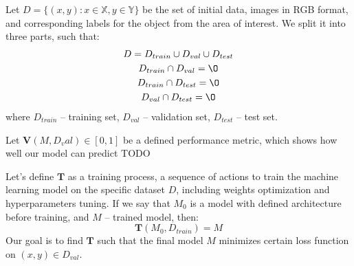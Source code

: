 \documentclass[14pt,a4paper]{extarticle}
\newcounter{e}
\numberwithin{equation}{section}
\numberwithin{figure}{section}
\begin{document}
Let $D = \{(x, y): x \in \mathbb{X}, y \in \mathbb{Y}\}$ be the set of initial data, images in RGB format, and corresponding labels for the object from the area of interest. We split it into three parts, such that:
\begin{equation}
    \begin{gathered}
        D = D_{train} \cup D_{val} \cup D_{test} \\
        D_{train} \cap D_{val} = \O\\
        D_{train} \cap D_{test} = \O\\
        D_{val} \cap D_{test} = \O\\
    \end{gathered}
\end{equation}
where $D_{train}$ -- training set, $D_{val}$ --  validation set, $D_{test}$ -- test set.

Let $\mathbf{V}(M, D_val) \in [0, 1]$ be a defined performance metric, which shows how well our model can predict TODO  

Let's define $\mathbf{T}$ as a training process, a sequence of actions to train the machine learning model on the specific dataset $D$, including weights optimization and hyperparameters tuning. If we say that $M_{0}$ is a model with defined architecture before training, and $M$ -- trained model, then:
\begin{equation}
    \mathbf{T}(M_{0}, D_{train}) = M  
\end{equation}
Our goal is to find $\mathbf{T}$ such that the final model $M$ minimizes certain loss function on $(x, y) \in D_{val}$. 
\end{document}
